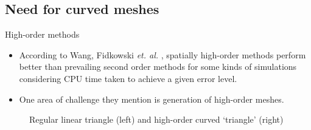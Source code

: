 \documentclass[t,12pt]{beamer}
\begin{document}
\subsection{Need for curved meshes}
\begin{frame}{High-order methods}
\begin{itemize}
  \item According to Wang, Fidkowski \emph{et. al.} , spatially high-order methods perform better than prevailing second order methods for some kinds of simulations considering CPU time taken to achieve a given error level.
  \item One area of challenge they mention is generation of high-order meshes.
\end{itemize}
\begin{figure}
		\centering
		\hspace{0.2in}
		\caption{Regular linear triangle (left) and high-order curved `triangle' (right)}
		\label{fig:curvedelement}
\end{figure}
\end{frame}
\end{document}
